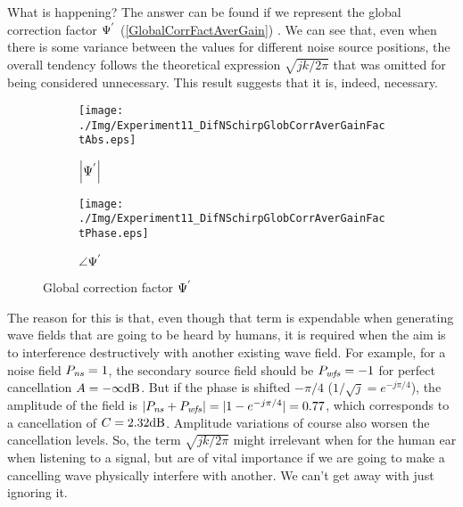 What is happening? The answer can be found if we represent the global correction factor $\globalCorrectionFactorAverGain$ (\autoref{GlobalCorrFactAverGain}) . We can see that, even when there is some variance between the values for different noise source positions, the overall tendency follows the theoretical expression $\sqrt{jk/2\pi}$ that was omitted for being considered unnecessary. This result suggests that it is, indeed, necessary.

\begin{figure}[h]
	\begin{subfigure}[b]{0.49\textwidth}
		\centering
		\texttt{[image: ./Img/Experiment11\_DifNSchirpGlobCorrAverGainFactAbs.eps]}
		\caption{$\abs{\globalCorrectionFactorAverGain}$}
		\label{GlobalCorrFactAbsAverGain}
	\end{subfigure}
	\begin{subfigure}[b]{0.49\textwidth}
		\centering
		\texttt{[image: ./Img/Experiment11\_DifNSchirpGlobCorrAverGainFactPhase.eps]}
		\caption{$\angle{\globalCorrectionFactorAverGain}$}
		\label{GlobalCorrFactPhaseAverGain}
	\end{subfigure}
\caption{Global correction factor $\globalCorrectionFactorAverGain$}
\label{GlobalCorrFactAverGain}
\end{figure}


The reason for this is that, even though that term is expendable when generating wave fields that are going to be heard by humans, it is required when the aim is to interference destructively with another existing wave field. For example, for a noise field $\Field[ns][frequency] = 1$, the secondary source field should be $\Field[wfs][frequency] = -1$ for perfect cancellation $\attenuation = -\infty \si{dB}$. But if the phase is shifted $-\pi/4$ ($1/\sqrt{j} = e^{-j\pi/4}$), the amplitude of the field is $|\Field[ns][frequency] + \Field[wfs][frequency]| = |1 - e^{-j\pi/4}| = 0.77$, which corresponds to a cancellation of $\cancellation = 2.32\si{dB}$. Amplitude variations of course also worsen the cancellation levels. So, the term $\sqrt{jk/2\pi}$ might irrelevant when for the human ear when listening to a signal, but are of vital importance if we are going to make a cancelling wave physically interfere with another. We can't get away with just ignoring it.

